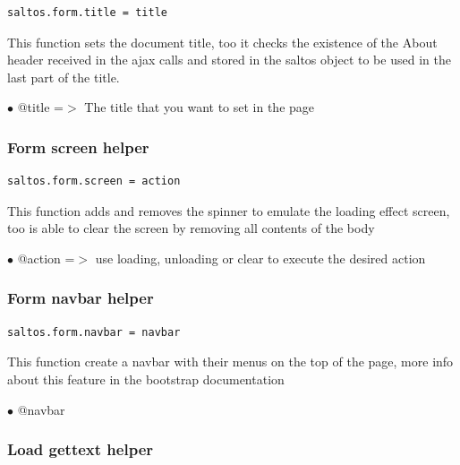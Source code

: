 \documentclass[a4paper]{article}
\begin{document}
\begin{lstlisting}
saltos.form.title = title
\end{lstlisting}

This function sets the document title, too it checks the existence of the About
header received in the ajax calls and stored in the saltos object to be used in the
last part of the title.

\begin{compactitem}
\item[\color{myblue}$\bullet$] @title =$>$ The title that you want to set in the page
\end{compactitem}

\hypertarget{toc231}{}
\subsubsection{Form screen helper}

\begin{lstlisting}
saltos.form.screen = action
\end{lstlisting}

This function adds and removes the spinner to emulate the loading effect screen, too is able
to clear the screen by removing all contents of the body

\begin{compactitem}
\item[\color{myblue}$\bullet$] @action =$>$ use loading, unloading or clear to execute the desired action
\end{compactitem}

\hypertarget{toc232}{}
\subsubsection{Form navbar helper}

\begin{lstlisting}
saltos.form.navbar = navbar
\end{lstlisting}

This function create a navbar with their menus on the top of the page, more
info about this feature in the bootstrap documentation

\begin{compactitem}
\item[\color{myblue}$\bullet$] @navbar
\end{compactitem}

\hypertarget{toc233}{}
\subsubsection{Load gettext helper}
\end{document}

